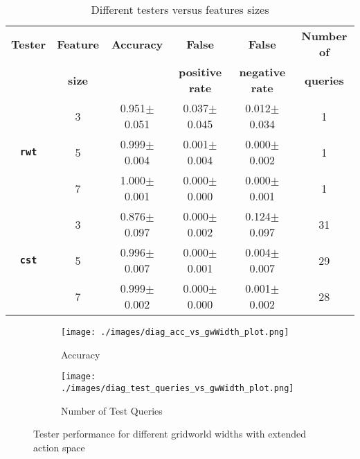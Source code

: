 \begin{table}[!hbtp]
    
  \caption{Different testers versus features sizes}
  \label{tab:diff_features}
  \centering
  \begin{tabular}{cccccc}
    \toprule
    \textbf{Tester}& \textbf{Feature} & \textbf{Accuracy} & \textbf{False} & \textbf{False} & \textbf{Number of} \\
    & \textbf{size} & & \textbf{positive rate} & \textbf{negative rate} & \textbf{queries} \\
    \midrule
     & 3 & 0.951$\pm$0.051&	0.037$\pm$0.045&	0.012$\pm$0.034&	1\\
     \textbf{\texttt{rwt}} & 5 & 0.999$\pm$0.004&	0.001$\pm$0.004&	0.000$\pm$0.002&	1\\
     & 7 & 1.000$\pm$	0.001&	0.000$\pm$0.000&	0.000$\pm$0.001&	1\\
     \midrule
     & 3 & 0.876$\pm$0.097&	0.000$\pm$0.002&	0.124$\pm$0.097&	31\\
     \textbf{\texttt{cst}} & 5 & 0.996$\pm$0.007&	0.000$\pm$0.001&	0.004$\pm$0.007&	29\\
     & 7 & 0.999$\pm$0.002&	0.000$\pm$0.000&	0.001$\pm$0.002&	28\\
     \bottomrule
  \end{tabular}
\end{table}

\begin{figure}[!hbtp]
     \centering
     \begin{subfigure}[!ht]{0.35\textwidth}
         \centering
         \texttt{[image: ./images/diag\_acc\_vs\_gwWidth\_plot.png]}
         \caption{Accuracy}
         \label{fig:diag_acc_vs_features_plot}
     \end{subfigure}
    \hspace{5mm}
    \begin{subfigure}[!ht]{0.35\textwidth}
         \centering
         \texttt{[image: ./images/diag\_test\_queries\_vs\_gwWidth\_plot.png]}
         \caption{Number of Test Queries}
         \label{fig:diag_test_queries_vs_features_plot}
     \end{subfigure}
    \caption{Tester performance for different gridworld widths with extended action space}
    \label{fig:diag_experiments}
\end{figure}

